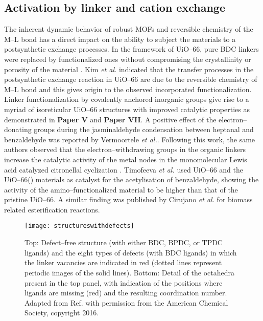 \subsection*{Activation by linker and cation exchange}
The inherent dynamic behavior of robust MOFs and reversible chemistry of the
M--L bond has a direct impact on the ability to subject the materials to a
postsynthetic exchange processes. In the framework of UiO--66, pure BDC linkers
were replaced by functionalized ones without compromising the crystallinity or
porosity of the material \cite{Kandiah2010a, Kandiah2010b}. Kim \textit{et
al.}\cite{Kim2012} indicated that the transfer processes in the postsynthetic exchange reaction in UiO--66 are due to the reversible chemistry of M--L bond
and this gives origin to the observed incorporated functionalization.
Linker functionalization by covalently anchored inorganic groups give rise to a
myriad of isoreticular UiO--66 structures with improved catalytic properties as
demonstrated in \textbf{Paper V} and \textbf{Paper VII}. A positive effect of the electron--donating groups
during the jasminaldehyde condensation between heptanal and benzaldehyde was
reported by Vermoortele \textit{et al.}\cite{Vermoortele2011}. Following this
work, the same authors observed that the electron--withdrawing
groups in the organic
linkers increase the catalytic activity of the metal nodes in the
monomolecular Lewis acid catalyzed citronellal
cyclization \cite{Vermoortele2012}. Timofeeva \textit{et
al.}\cite{Timofeeva2014} used UiO--66 and the UiO--66() materials as catalyst for the acetylisation of
benzaldehyde, showing the activity of the amino--functionalized material to be
higher than that of the pristine UiO--66. A similar finding was published by
Cirujano \textit{et al.}\cite{Cirujano2015} for biomass related esterification reactions.

\begin{figure}[p]
 \begin{center}
	\centering
	\texttt{[image: structureswithdefects]}
	\caption[Top: Defect--free structure (with either BDC, BPDC, or TPDC ligands)
	and the eight types of defects (with BDC ligands) in
	which the linker vacancies are indicated in red (dotted lines represent
	periodic images of the solid lines). Bottom: Detail of the  octahedra
	present in the top panel, with indication of the positions where ligands are
	missing (red) and the resulting coordination number.]{Top: Defect--free structure (with either BDC, BPDC, or TPDC ligands)
	and the eight types of defects (with BDC ligands) in
	which the linker vacancies are indicated in red (dotted lines represent
	periodic images of the solid lines). Bottom: Detail of the  octahedra
	present in the top panel, with indication of the positions where ligands are
	missing (red) and the resulting coordination number. Adapted from Ref.
	\cite{Rogge2016} with permission from the American Chemical Society, copyright 2016.}
	\label{fig:structureswithdefects}
 \end{center}
\end{figure}

